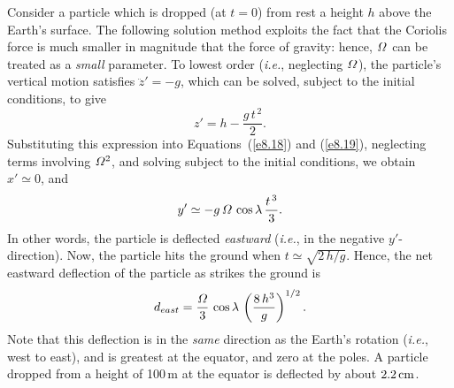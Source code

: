 Consider a particle which is dropped (at $t=0$) from rest a height $h$ above the Earth's
surface. The following solution method exploits the fact that the
Coriolis force is much smaller in magnitude that the force of gravity: hence,
${\mit\Omega}$ can be treated as a {\em small}\/ parameter. 
To lowest order ({\em i.e.}, neglecting ${\mit\Omega}$), the
particle's vertical motion satisfies $\ddot{z}'=-g$, which can be solved,
subject to the initial conditions, to give
\begin{equation}
z' = h - \frac{g\,t^{\,2}}{2}.
\end{equation}
Substituting this expression into Equations~(\ref{e8.18}) and (\ref{e8.19}), 
neglecting terms involving ${\mit\Omega}^2$, and solving subject to the
initial conditions, we obtain
$x'\simeq 0$, and
\begin{equation}
y' \simeq - g\,{\mit\Omega}\,\cos\lambda\,\frac{t^{\,3}}{3}.
\end{equation}
In other words, the particle is deflected {\em eastward}\/ ({\em i.e.}, in the negative
$y'$-direction). Now, the particle hits the ground when
$t\simeq \sqrt{2\,h/g}$. Hence, the net eastward deflection of the particle as strikes the ground is
\begin{equation}
d_{east} = \frac{{\mit\Omega}}{3}\,\cos\lambda\,\left(\frac{8\,h^3}{g}\right)^{1/2}.
\end{equation}
Note that this deflection is in the {\em same}\/ direction as the Earth's rotation ({\em i.e.}, west to east),
and is greatest at the equator, and zero at the poles. 
A particle dropped from a height of 100\,m at the equator is deflected by about
$2.2\,{\rm cm}$. 


